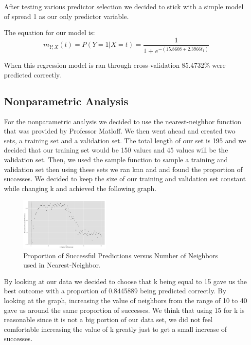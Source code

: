 \documentclass{article}
\begin{document}
After testing various predictor selection we decided to stick with a
simple model of spread 1 as our only predictor variable.

The equation for our model is:
\begin{equation}
\label{logit2}
m_{Y;X}(t) = P(Y = 1 | X = t) = \frac{1}{1+e^{-(15.8608+2.3966
t_1)}}
\end{equation}

When this regression model is ran through cross-validation 85.4732\%
were predicted correctly.  

\subsection{Nonparametric Analysis}

For the nonparametric analysis we decided to use the nearest-neighbor function
that was provided by Professor Matloff. We then went ahead and created two
sets, a training set and a validation set. The total length of our set is 195
and we decided that our training set would be 150 values and 45 values will be
the validation set. Then, we used the sample function to sample a training and
validation set then using these sets we ran knn and and found the proportion of
successes. We decided to keep the size of our training and validation set
constant while changing k and achieved the following graph.

\begin{figure}
  \centering
  \includegraphics[width=0.4\textwidth]{figures/knn_prop_pred.png}
  \caption{Proportion of Successful Predictions versus Number of Neighbors used in Nearest-Neighbor.}
\end{figure}

By looking at our data we decided to choose that k being equal to 15 gave us
the best outcome with a proportion of 0.8445889 being predicted correctly. By
looking at the graph, increasing the value of neighbors from the range of 10 to
40 gave us around the same proportion of successes. We think that using 15 for
k is reasonable since it is not a big portion of our data set, we did not feel
comfortable increasing the value of k greatly just to get a small increase of
successes.
\end{document}
